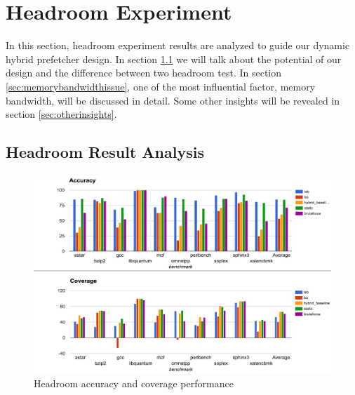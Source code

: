 \section{Headroom Experiment}
\label{sec:headroom}
In this section, headroom experiment results are analyzed to guide our dynamic hybrid prefetcher design. In section \ref{sec:headroomanalysis} we will talk about the potential of our design and the difference between two headroom test. In section \ref{sec:memorybandwidthissue}, one of the most influential factor, memory bandwidth, will be discussed in detail. Some other insights will be revealed in section \ref{sec:otherinsights}.

  \subsection{Headroom Result Analysis}
  \label{sec:headroomanalysis}

  \begin{figure}[ht!]
	   \centering
	   \includegraphics[width=1.0\textwidth]{images/headroom_acc_cov.png}
	   \caption{Headroom accuracy and coverage performance}
	  \label{fig:headroom_acc_cov}
  \end{figure}

